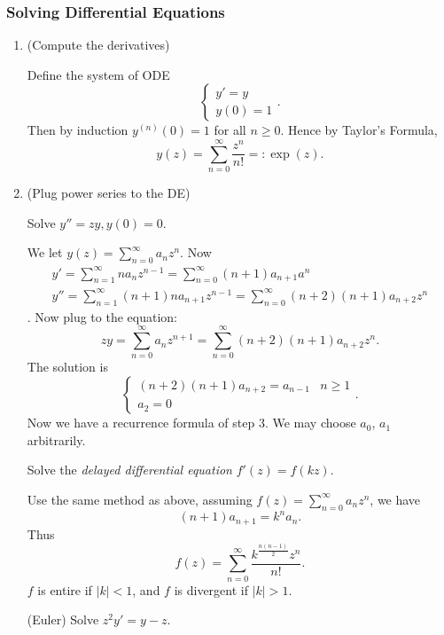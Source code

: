 \subsubsection{Solving Differential Equations}

\begin{enumerate}
	\item (Compute the derivatives)
\begin{example}
	Define the system of ODE
	\[
		\begin{cases}
			y' = y \\
			y(0) = 1
		\end{cases}
	.\] 
	Then by induction $y^{(n)}(0) = 1$ for all $n\ge 0$. Hence by Taylor's Formula,
	\[
		y(z) = \sum_{n=0}^{\infty} \frac{z^n}{n!} =: \exp(z)
	.\] 
\end{example}
	\item (Plug power series to the DE)
		\begin{example}
			Solve $y'' = zy, y(0) = 0$.

			We let $y(z) = \sum_{n=0}^{\infty} a_n z^n$.
			Now 
			\begin{gather}
				y' = \sum_{n=1}^{\infty} n a_n z^{n-1} = \sum_{n=0}^{\infty} (n+1) a_{n+1}a^n\\
				y'' = \sum_{n=1}^{\infty} (n+1)n a_{n+1} z^{n-1} = \sum_{n=0}^{\infty} (n+2)(n+1)a_{n+2} z^n
			\end{gather}
			.
			Now plug to the equation:
			\[
				zy = \sum_{n=0}^{\infty} a_n z^{n+1} = \sum_{n=0}^{\infty} (n+2)(n+1)a_{n+2} z^n			.\] 
		The solution is
		\[
			\begin{cases}
				(n+2)(n+1)a_{n+2} = a_{n-1} & n\ge 1\\
				a_2 = 0

			\end{cases}
		.\] 
		Now we have a recurrence formula of step $3$. We may choose $a_0$, $a_1$ arbitrarily.

	\end{example}
	\begin{example}
		Solve the \textit{delayed differential equation} $f'(z) = f(kz)$.

		Use the same method as above, assuming $f(z) = \sum_{n=0}^{\infty} a_n z^n$, we have
		\[
			(n+1)a_{n+1} = k^n a_n
		.\] 
		Thus
		\[
			f(z) = \sum_{n=0}^{\infty} \frac{k^{\frac{n(n-1)}{2}}z^n}{n!}
		.\] 
		$f$ is entire if $|k|<1$, and $f$ is divergent if $|k| > 1$.
	\end{example}
	\begin{example}(Euler)
		Solve $z^2 y' = y - z$.


\end{example}
\end{enumerate}
